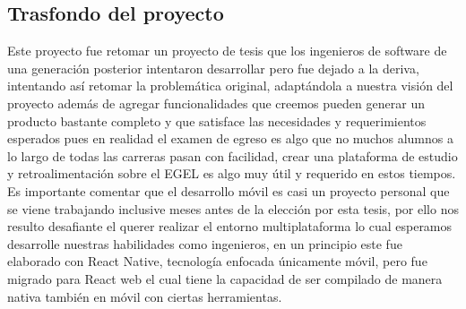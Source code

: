 \documentclass[12pt]{book}
\begin{document}
	\subsection{Trasfondo del proyecto}
	{\normalsize Este proyecto fue retomar un proyecto de tesis que los ingenieros de software de una generación posterior intentaron desarrollar pero fue dejado a la deriva, intentando así retomar la problemática original, adaptándola a nuestra visión del proyecto además de agregar funcionalidades que creemos pueden generar un producto bastante completo y que satisface las necesidades y requerimientos esperados pues en realidad el examen de egreso es algo que no muchos alumnos a lo largo de todas las carreras pasan con facilidad, crear una plataforma de estudio y retroalimentación sobre el EGEL es algo muy útil y requerido en estos tiempos.
		\\
	Es importante comentar que el desarrollo móvil es casi un proyecto personal que se viene trabajando inclusive meses antes de la elección por esta tesis, por ello nos resulto desafiante el querer realizar el entorno multiplataforma lo cual esperamos desarrolle nuestras habilidades como ingenieros, en un principio este fue elaborado con React Native, tecnología enfocada únicamente móvil, pero fue migrado para React web el cual tiene la capacidad de ser compilado de manera nativa también en móvil con ciertas herramientas. }
\end{document}
